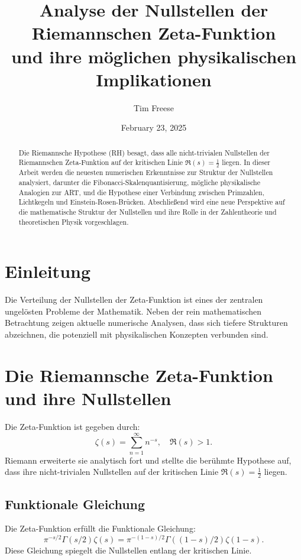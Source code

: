 \documentclass[a4paper,12pt]{article}
\title{Analyse der Nullstellen der Riemannschen Zeta-Funktion \\ und ihre möglichen physikalischen Implikationen}
\author{Tim Freese}
\date{February 23, 2025}
\begin{document}
\maketitle

\begin{abstract}
Die Riemannsche Hypothese (RH) besagt, dass alle nicht-trivialen Nullstellen der Riemannschen Zeta-Funktion auf der kritischen Linie \( \Re(s) = \frac{1}{2} \) liegen. In dieser Arbeit werden die neuesten numerischen Erkenntnisse zur Struktur der Nullstellen analysiert, darunter die Fibonacci-Skalenquantisierung, mögliche physikalische Analogien zur ART, und die Hypothese einer Verbindung zwischen Primzahlen, Lichtkegeln und Einstein-Rosen-Brücken. Abschließend wird eine neue Perspektive auf die mathematische Struktur der Nullstellen und ihre Rolle in der Zahlentheorie und theoretischen Physik vorgeschlagen.
\end{abstract}

\tableofcontents

\section{Einleitung}
Die Verteilung der Nullstellen der Zeta-Funktion ist eines der zentralen ungelösten Probleme der Mathematik. Neben der rein mathematischen Betrachtung zeigen aktuelle numerische Analysen, dass sich tiefere Strukturen abzeichnen, die potenziell mit physikalischen Konzepten verbunden sind.

\section{Die Riemannsche Zeta-Funktion und ihre Nullstellen}
Die Zeta-Funktion ist gegeben durch:
\begin{equation}
\zeta(s) = \sum_{n=1}^{\infty} n^{-s}, \quad \Re(s) > 1.
\end{equation}
Riemann erweiterte sie analytisch fort und stellte die berühmte Hypothese auf, dass ihre nicht-trivialen Nullstellen auf der kritischen Linie \( \Re(s) = \frac{1}{2} \) liegen.

\subsection{Funktionale Gleichung}
Die Zeta-Funktion erfüllt die Funktionale Gleichung:
\begin{equation}
\pi^{-s/2} \Gamma(s/2) \zeta(s) = \pi^{-(1-s)/2} \Gamma((1-s)/2) \zeta(1-s).
\end{equation}
Diese Gleichung spiegelt die Nullstellen entlang der kritischen Linie.
\end{document}
